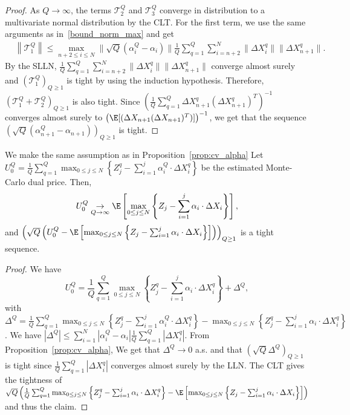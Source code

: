 \begin{proof}
As $Q\to \infty$, the terms $\mathcal{T}^Q_2$ and $\mathcal{T}^Q_3$ converge in distribution to a multivariate normal distribution by the CLT. For the first term, we  use the same arguments as in~\eqref{bound_norm_max}  and get
\begin{align*}
  & \left\|    \mathcal{T}^Q_1 \right\| \le \max_{n+2\le i \le N} \|\sqrt{Q}(\alpha^Q_i-\alpha_i) \| \frac 1 Q \sum_{q=1}^Q  \sum_{i=n+2}^{N} \| \Delta X^q_i\| \| \Delta X^q_{n+1} \|. 
\end{align*}
By the SLLN, $\frac 1 Q \sum_{q=1}^Q  \sum_{i=n+2}^{N} \| \Delta X^q_i\| \| \Delta X^q_{n+1} \|$ converge almost surely and $(\mathcal{T}^Q_1)_{Q\ge 1}$ is tight by using the induction hypothesis. Therefore, $(\mathcal{T}^Q_1+\mathcal{T}^Q_2)_{Q\ge 1}$  is also tight. Since  $\left( \frac 1 Q \sum_{q=1}^Q \Delta X^q_{n+1} (\Delta X^q_{n+1})^T \right)^{-1}$ converges almost surely to $\left(\E[(\Delta X_{n+1} (\Delta X_{n+1})^T)]\right)^{-1}$, we get that the sequence $\left(\sqrt{Q}(\alpha_{n+1}^Q - \alpha_{n+1})\right)_{Q \ge 1}$ is  tight.
\end{proof}


\begin{corollary}\label{cor_price}
  We make the same assumption as in Proposition~\ref{prop:cv_alpha}
  Let $U_0^Q= \frac 1 Q \sum_{q=1}^Q \max_{0\le j \le N} \left\{ Z^q_{j} - \sum_{i=1}^j \alpha^Q_i \cdot \Delta X^q_i \right\}$ be the estimated Monte-Carlo dual price. Then, 
  $$  U_0^Q \underset{Q\to \infty} \to \E \left[ \max_{0\le j \le N} \left\{ Z_{j} - \sum_{i=1}^j \alpha_i \cdot \Delta X_i \right\} \right],$$
  and $\left(\sqrt{Q}\left( U_0^Q - \E \left[ \max_{0\le j \le N} \left\{ Z_{j} - \sum_{i=1}^j \alpha_i \cdot \Delta X_i \right\} \right] \right)\right)_{Q\ge 1}$ is a tight sequence. 
\end{corollary}
\begin{proof}
  We have 
  $$ U_0^Q= \frac 1 Q \sum_{q=1}^Q \max_{0\le j \le N} \left\{ Z^q_{j} - \sum_{i=1}^j \alpha_i \cdot \Delta X^q_i \right\} + \Delta^Q,  $$
  with $\Delta^Q=\frac 1 Q \sum_{q=1}^Q  \max_{0 \le j \le N} \left\{ Z^q_{j} - \sum_{i=1}^j \alpha^Q_i \cdot \Delta X^q_i \right\} - \max_{0 \le j \le N} \left\{ Z^q_{j} - \sum_{i=1}^j \alpha_i \cdot \Delta X^q_i \right\}$. We have $|\Delta^Q|\le \sum_{i=1}^N |\alpha_i^Q-\alpha_i| \frac 1Q \sum_{q=1}^Q |\Delta X_i^q| $. From Proposition~\ref{prop:cv_alpha}, We get that $\Delta^Q \to 0$ a.s. and that $(\sqrt{Q} \Delta^Q)_{Q \ge 1}$ is tight since $\frac 1Q \sum_{q=1}^Q |\Delta X_i^q| $ converges almost surely by the LLN. The CLT gives the tightness of $\sqrt{Q}\left( \frac 1 Q \sum_{q=1}^Q \max_{0\le j \le N} \left\{ Z^q_{j} - \sum_{i=1}^j \alpha_i \cdot \Delta X^q_i \right\} -\E \left[ \max_{0\le j \le N} \left\{ Z_{j} - \sum_{i=1}^j \alpha_i \cdot \Delta X_i \right\} \right] \right)$ and thus the claim. 
\end{proof}



